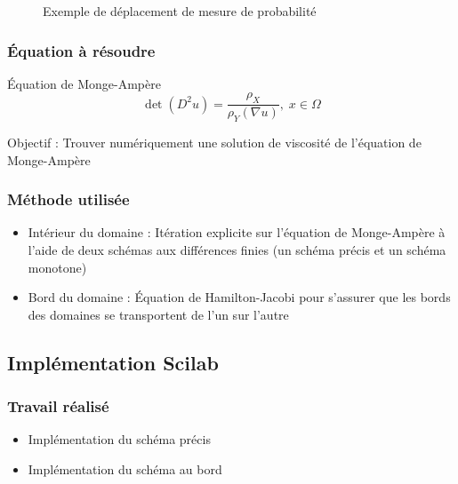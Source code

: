 \documentclass[10pt]{beamer}
\begin{document}
\begin{frame}
\begin{figure}
\begin{center}
                           \caption{Exemple de déplacement de mesure de probabilité}
                           \end{center}
                           \end{figure}

                           \end{frame}


                           \begin{frame}
                           \frametitle{Équation à résoudre}

                           \begin{block}{Équation de Monge-Ampère}
                           $$ \det(D^2 u) = \frac{\rho_X}{\rho_Y(\nabla u)}, \; x \in \Omega $$
                           \end{block}
\bigskip
Objectif : Trouver numériquement une solution de viscosité de 
l'équation de Monge-Ampère
\end{frame}

\begin{frame}
\frametitle{Méthode utilisée}

\begin{itemize}
\item Intérieur du domaine : Itération explicite sur l'équation de Monge-Ampère à l'aide de deux schémas aux différences finies
(un schéma précis et un schéma monotone) \\

    \item Bord du domaine : Équation de Hamilton-Jacobi pour 
    s'assurer que les bords des domaines se transportent de l'un
    sur l'autre
    \end{itemize}

    \end{frame}
    \subsection{Implémentation Scilab}

    \begin{frame}
    \frametitle{Travail réalisé}

    \begin{itemize}
    \item Implémentation du schéma précis \\

    \item Implémentation du schéma au bord \\

    \end{itemize}
    \end{frame}
\end{document}
